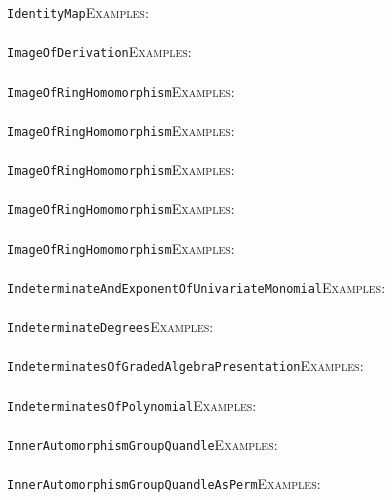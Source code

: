 \documentclass[a4paper,11pt]{report}
\begin{document}
{{ \texttt{IdentityMap}{\nobreakspace}{\nobreakspace}{\nobreakspace}{\nobreakspace}\textsc{Examples:} \\
 \\
 \texttt{ImageOfDerivation}{\nobreakspace}{\nobreakspace}{\nobreakspace}{\nobreakspace}\textsc{Examples:} \\
 \\
 \texttt{ImageOfRingHomomorphism}{\nobreakspace}{\nobreakspace}{\nobreakspace}{\nobreakspace}\textsc{Examples:} \\
 \\
 \texttt{ImageOfRingHomomorphism}{\nobreakspace}{\nobreakspace}{\nobreakspace}{\nobreakspace}\textsc{Examples:} \\
 \\
 \texttt{ImageOfRingHomomorphism}{\nobreakspace}{\nobreakspace}{\nobreakspace}{\nobreakspace}\textsc{Examples:} \\
 \\
 \texttt{ImageOfRingHomomorphism}{\nobreakspace}{\nobreakspace}{\nobreakspace}{\nobreakspace}\textsc{Examples:} \\
 \\
 \texttt{ImageOfRingHomomorphism}{\nobreakspace}{\nobreakspace}{\nobreakspace}{\nobreakspace}\textsc{Examples:} \\
 \\
 \texttt{IndeterminateAndExponentOfUnivariateMonomial}{\nobreakspace}{\nobreakspace}{\nobreakspace}{\nobreakspace}\textsc{Examples:} \\
 \\
 \texttt{IndeterminateDegrees}{\nobreakspace}{\nobreakspace}{\nobreakspace}{\nobreakspace}\textsc{Examples:} \\
 \\
 \texttt{IndeterminatesOfGradedAlgebraPresentation}{\nobreakspace}{\nobreakspace}{\nobreakspace}{\nobreakspace}\textsc{Examples:} \\
 \\
 \texttt{IndeterminatesOfPolynomial}{\nobreakspace}{\nobreakspace}{\nobreakspace}{\nobreakspace}\textsc{Examples:} \\
 \\
 \texttt{InnerAutomorphismGroupQuandle}{\nobreakspace}{\nobreakspace}{\nobreakspace}{\nobreakspace}\textsc{Examples:} \\
 \\
 \texttt{InnerAutomorphismGroupQuandleAsPerm}{\nobreakspace}{\nobreakspace}{\nobreakspace}{\nobreakspace}\textsc{Examples:} \\
 \\
}}
\end{document}
